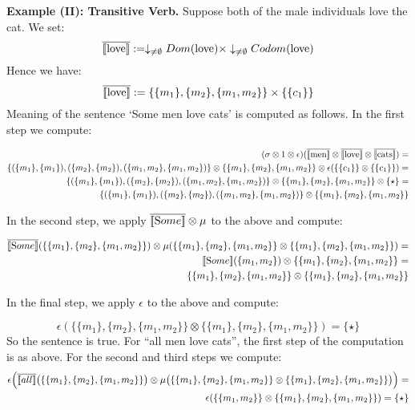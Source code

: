 \bigskip
\noindent
{\bf Example (II): Transitive Verb.} Suppose both of  the male individuals love the cat. We set:
\[
\overline{[\![ \text{love} ]\!]} := \downarrow_{\neq \emptyset} Dom(\text{love}) \times \downarrow_{\neq \emptyset} Codom(\text{love})
\] 
Hence we have:
\[
\overline{[\![ \text{love} ]\!]} := \{\{m_1\}, \{m_2\}, \{m_1, m_2\}\} \times \{\{c_1\}\}
\]
Meaning of the sentence `Some men love cats' is computed as follows. In the first step we compute:

\begin{align*}
(\sigma \otimes 1 \otimes \epsilon)(\overline{[\![ \text{men} ]\!]} \otimes \overline{[\![ \text{love} ]\!]} \otimes \overline{[\![ \text{cats} ]\!]}) =& \\
   \{(\{m_1\}, \{m_1\}), (\{m_2\}, \{m_2\}), (\{m_1, m_2\}, \{m_1, m_2\}) \} \otimes
   \{\{m_1\}, \{m_2\}, \{m_1, m_2\}\} \otimes \epsilon(\{\{c_1\}\} \otimes \{\{c_1\}\}) = \\
     \{(\{m_1\}, \{m_1\}), (\{m_2\}, \{m_2\}), (\{m_1, m_2\}, \{m_1, m_2\}) \} \otimes
   \{\{m_1\}, \{m_2\}, \{m_1, m_2\}\} \otimes  \{\star\}  = \\
     \{(\{m_1\}, \{m_1\}), (\{m_2\}, \{m_2\}), (\{m_1, m_2\}, \{m_1, m_2\}) \} \otimes
   \{\{m_1\}, \{m_2\}, \{m_1, m_2\}\}  
\end{align*}

\noindent
In the second step, we apply $\overline{[\![ \text Some ]\!]} \otimes \mu$ to the above and compute:

\begin{align*}
\overline{\semantics{\text Some}} (\{\{m_1\}, \{m_2\}, \{m_1, m_2\}\}) \otimes \mu(\{\{m_1\}, \{m_2\}, \{m_1, m_2\}\} \otimes \{\{m_1\}, \{m_2\}, \{m_1, m_2\}\}) = \\
 \semantics{\text Some}(\{m_1, m_2\})  \otimes \{\{m_1\}, \{m_2\}, \{m_1, m_2\}\} = \\
\{\{m_1\}, \{m_2\}, \{m_1,m_2\}\} \otimes   \{\{m_1\}, \{m_2\}, \{m_1, m_2\}\}\\
\end{align*}

\noindent
In the final step, we apply $\epsilon$ to the above and compute:

\[
\epsilon(\{\{m_1\}, \{m_2\}, \{m_1,m_2\}\} \otimes   \{\{m_1\}, \{m_2\}, \{m_1, m_2\}\}) = \{\star\}
\]
So the sentence is true. For ``all men love cats'', the first step of the computation is as above. For the second and third steps we compute:
\begin{align*}
\epsilon\Big(\overline{[\![ all ]\!]} \big(\{\{m_1\}, \{m_2\}, \{m_1, m_2\}\}\big) \otimes  \mu \big(\{\{m_1\}, \{m_2\}, \{m_1, m_2\}\} \otimes \{\{m_1\}, \{m_2\}, \{m_1, m_2\}\}\big)\Big)=\\
\epsilon(\{\{m_1, m_2\}\} \otimes  \{\{m_1\}, \{m_2\}, \{m_1, m_2\}\}) = \{\star\}
\end{align*}

